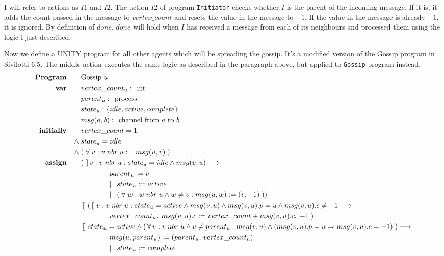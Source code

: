 \documentclass[10pt,letter]{article}
\def\fatbar{\talloblong}
\begin{document}
I will refer to actions as $I1$ and $I2$. The action $I2$ of program \texttt{Initiator} checks whether $I$ is the parent of the incoming message. If it is, it adds the count passed in the message to $vertex\_count$ and resets the value in the message to $-1$. If the value in the message is already $-1$, it is ignored. By definition of $done$, $done$ will hold when $I$ has received a message from each of its neighbours and processed them using the logic I just described.

Now we define a UNITY program for all other agents which will be spreading the gossip. It's a modified version of the Gossip program in Sivilotti 6.5. The middle action executes the same logic as described in the paragraph above, but applied to \texttt{Gossip} program instead.
\begin{align*}
\textrm{\textbf{Program}} \qquad & \textrm{Gossip}\; u
\\
\textrm{\textbf{var}} \qquad & vertex\_count_u\; \textrm{:\; int}
\\ & parent_u\; \textrm{:\; process}
\\ & state_u\; \textrm{:\;} \{idle, active, complete\}
\\ & msg(a, b)\; \textrm{:\; channel from $a$ to $b$}
\\
\textrm{\textbf{initially}} \qquad & vertex\_count = 1
\\
\land\; & state_u = idle
\\
\land\; & (\; \forall\; v : v\; nbr\; u : \neg\, msg(u, v)\; )
\\
\textrm{\textbf{assign}} \qquad &
(\, \fatbar\, v : v\; nbr\; u : state_u = idle \land msg(v, u) \longrightarrow
\\
& \qquad \qquad parent_u := v\; 
\\
& \qquad \qquad \lVert\;\; state_u := active\;
\\
& \qquad \qquad \lVert\;\; (\; \forall\; w : w\; nbr\; u \land w \neq v : msg(u, w) := (v, -1)\; ) )
\\ &
\fatbar (\, \fatbar\, v : v\; nbr\; u : state_u = active \land msg(v, u) \land msg(v, u).p = u \land msg(v, u).c \neq -1 \longrightarrow
\\
& \qquad \qquad vertex\_count_u,\; msg(v, u).c := vertex\_count + msg(v, u).c,\; -1\; )
\\ &
\fatbar state_u = active \land (\, \forall\, v : v\; nbr\; u \land v \neq parent_u : msg(v, u) \land (msg(v, u).p = u \Rightarrow  msg(v, u).c = -1)\;) \longrightarrow
\\
& \qquad \qquad msg(u, parent_u) := (parent_u,\, vertex\_count_u)\; 
\\
& \qquad \qquad \lVert\;\; state_u := complete\;
\end{align*}
\end{document}
